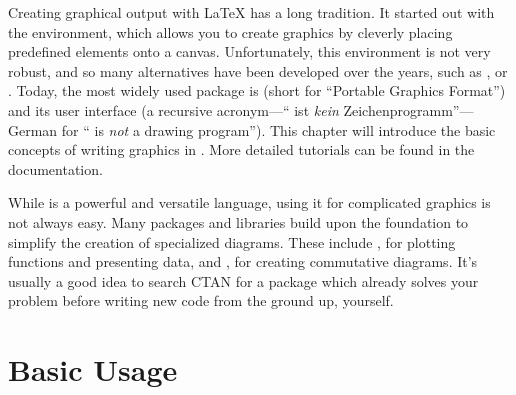 Creating graphical output with \LaTeX{} has a long tradition. It started out
with the  environment, which allows you to create graphics by
cleverly placing predefined elements onto a canvas. Unfortunately, this
environment is not very robust, and so many alternatives have been developed
over the years, such as ,  or .
Today, the most
widely used package is  (short for \enquote{Portable Graphics
  Format}) and its user interface \TikZ{} (a recursive acronym---\enquote{\TikZ{}
  ist \textit{kein} Zeichenprogramm}---German for \enquote{\TikZ{} is
  \textit{not} a drawing program}). This chapter will introduce the basic
concepts of writing graphics in \TikZ{}. More detailed tutorials can be found
in the  documentation.

While \TikZ{} is a powerful and versatile language, using it for
complicated graphics is not always easy. Many packages and libraries build
upon the  foundation to simplify the creation of specialized diagrams.
These include , for plotting functions and presenting data, and
, for creating commutative diagrams. It's usually a
good idea to search CTAN for a package which already solves your problem
before writing new \TikZ{} code from the ground up, yourself.

\section{Basic Usage}

